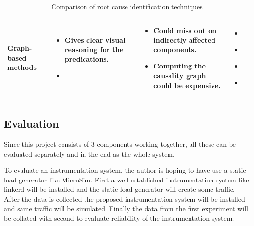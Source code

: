 \begin{longtable}{| p{23mm} | p{42mm} | p{42mm} | p{42mm} |}
    Graph-based methods &
    \vspace{-8mm}
    \begin{itemize}[leftmargin=0mm,noitemsep,nolistsep,label={}] 
        \item Gives clear visual reasoning for the predications.
        \item  
        \vspace{-7mm}
    \end{itemize} &
    \vspace{-8mm}
    \begin{itemize}[leftmargin=0mm,noitemsep,nolistsep,label={}] 
        \item Could miss out on indirectly affected components.
        \item Computing the causality graph could be expensive.
        \vspace{-7mm}
    \end{itemize} &
    \vspace{-8mm}
    \begin{itemize}[leftmargin=0mm,noitemsep,nolistsep,label={}] 
        \item \cite{samir2019dla}
        \item \cite{wu2020microrca}
        \item \cite{ma2020automap}
        \item \cite{meng2020localizing}
        \vspace{-7mm}
    \end{itemize} \\ \hline

    \caption{Comparison of root cause identification techniques}
\end{longtable}

\subsection{Evaluation}

Since this project consists of 3 components working together, all these can be evaluated separately and in the end as the whole system.

To evaluate an instrumentation system, the author is hoping to have use a static load generator like \href{https://github.com/MrSupiri/MicroSim}{MicroSim}. First a well established instrumentation system like linkerd will be installed and the static load generator will create some traffic. After the data is collected the proposed instrumentation system will be installed and same traffic  will be simulated. Finally the data from the first experiment will be collated with second to evaluate reliability of the instrumentation system.

